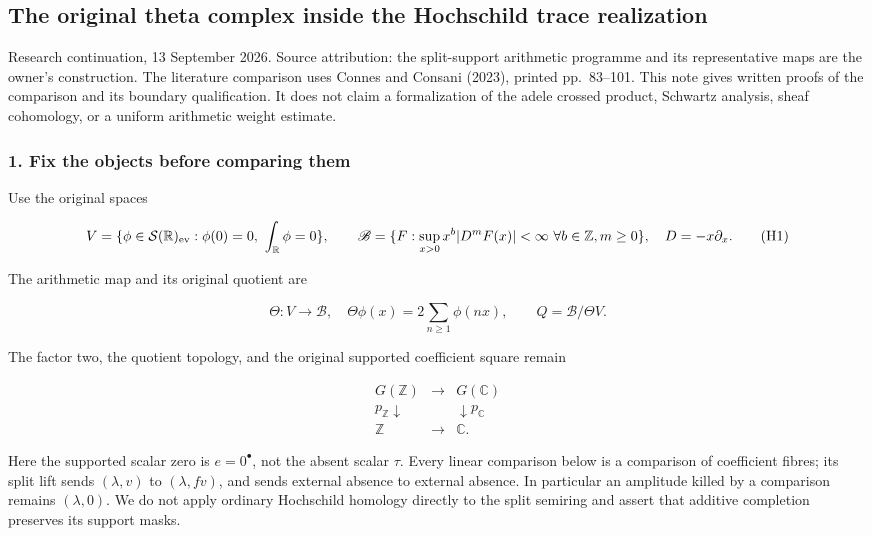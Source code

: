 \subsection{The original theta complex inside the Hochschild trace realization}\label{endpoint-cc_hochschild--the-original-theta-complex-inside-the-hochschild-trace-realization}

Research continuation, 13 September 2026. Source attribution: the split-support arithmetic programme and its representative maps are the owner's construction. The literature comparison uses Connes and Consani (2023), printed pp.~83--101. This note gives written proofs of the comparison and its boundary qualification. It does not claim a formalization of the adele crossed product, Schwartz analysis, sheaf cohomology, or a uniform arithmetic weight estimate.

\subsubsection{1. Fix the objects before comparing them}\label{endpoint-cc_hochschild--fix-the-objects-before-comparing-them}

Use the original spaces

\[
V=\{\phi\in\mathcal S(\mathbb R)_{\rm ev}:\phi(0)=0,\ \int_{\mathbb R}\phi=0\},\qquad
\mathscr B=\{F:\sup_{x>0}x^b|D^mF(x)|<\infty\ \forall b\in\mathbb Z,m\ge0\},\quad D=-x\partial_x.
\tag{H1}
\]

The arithmetic map and its original quotient are

\[
\Theta:V\longrightarrow\mathscr B,\quad \Theta\phi(x)=2\sum_{n\ge1}\phi(nx),\qquad Q=\mathscr B/\Theta V.
\tag{H2}
\]

The factor two, the quotient topology, and the original supported coefficient square remain

\[
\begin{array}{ccc}G(\mathbb Z)&\longrightarrow&G(\mathbb C)\\p_{\mathbb Z}\downarrow&&\downarrow p_{\mathbb C}\\\mathbb Z&\longrightarrow&\mathbb C.\end{array}
\tag{H3}
\]

Here the supported scalar zero is \(e=0^\bullet\), not the absent scalar \(\tau\). Every linear comparison below is a comparison of coefficient fibres; its split lift sends \((\lambda,v)\) to \((\lambda,fv)\), and sends external absence to external absence. In particular an amplitude killed by a comparison remains \((\lambda,0)\). We do not apply ordinary Hochschild homology directly to the split semiring and assert that additive completion preserves its support masks.

